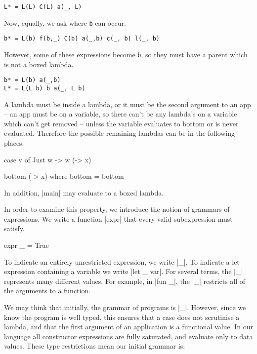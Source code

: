 \documentclass[preprint]{sigplanconf}
\begin{document}
\begin{verbatim}
L* = L(L) C(L) a(_, L)
\end{verbatim}

Now, equally, we ask where \verb"b" can occur.

\begin{verbatim}
b* = L(b) f(b,_) C(b) a(_,b) c(_, b) l(_, b)
\end{verbatim}

However, some of these expressions become \verb"b", so they must have a parent which is not a boxed lambda.

\begin{verbatim}
b* = L(b) a(_,b)
L* = L(L b) b a(_, L b)
\end{verbatim}

A lambda must be inside a lambda, or it must be the second argument to an app -- an app must be on a variable, so there can't be any lambda's on a variable which can't get removed -- unless the variable evaluates to bottom or is never evaluated. Therefore the possible remaining lambdas can be in the following places:

\begin{code}
case v of
    Just w -> w (\x -> x)

bottom (\x -> x)
    where bottom = bottom
\end{code}

In addition, |main| may evaluate to a boxed lambda.




In order to examine this property, we introduce the notion of grammars of expressions. We write a function |expr| that every valid subexpression must satisfy.

\begin{code}
expr _ = True
\end{code}

To indicate an entirely unrestricted expression, we write |_|. To indicate a let expression containing a variable we write |let _ var|. For several terms, the |_| represents many different values. For example, in |fun _|, the |_| restricts all of the arguments to a function.

We may think that initially, the grammar of programs is |_|. However, since we know the program is well typed, this ensures that a case does not scrutinise a lambda, and that the first argument of an application is a functional value. In our language all constructor expressions are fully saturated, and evaluate only to data values. These type restrictions mean our initial grammar is:
\end{document}
